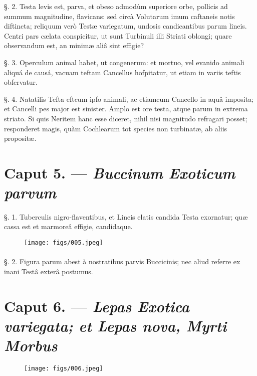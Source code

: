 \documentclass[a4paper, 11pt, oneside, polutonikogreek, german]{article}
\begin{document}
§. 2. Testa levis est, parva, et obeso admodùm superiore orbe, pollicis ad summum magnitudine, flavicans: sed circà Volutarum imum caftaneis notis diftincta; reliquum verò Testæ variegatum, undosis candicantibus parum lineis. Centri pars cælata conspicitur, ut sunt Turbinuli illi Striati oblongi; quare observandum est, an minimæ aliâ sint effigie?

§. 3. Operculum animal habet, ut congenerum: et mortuo, vel evanido animali aliquá de causá, vacuam teftam Cancellus hofpitatur, ut etiam in variis teftis obfervatur.

§. 4. Natatilis Tefta eftcum ipfo animali, ac etiamcum Cancello in aquâ imposita; et Cancelli pes major est sinister. Amplo est ore testa, atque parum in extrema striato. Si quis Neritem hanc esse diceret, nihil nisi magnitudo refragari posset; responderet magis, quàm Cochlearum tot species non turbinatæ, ab aliis propositæ.

\section{Caput 5. --- \emph{Buccinum Exoticum parvum}}
\paragraph{}
§. 1. Tuberculis nigro-flaventibus, et Lineis elatis candida Testa exornatur; quæ cassa est et marmoreâ effigie, candidaque.

\begin{figure}[H]
\centering
\texttt{[image: figs/005.jpeg]}

\end{figure}
\paragraph{}
§. 2. Figura parum abest à nostratibus parvis Buccicinis; nec aliud referre ex inani Testâ exterâ postumus.

\section{Caput 6. --- \emph{Lepas Exotica variegata; et Lepas nova, Myrti Morbus}}
\begin{figure}[H]
\centering
\texttt{[image: figs/006.jpeg]}

\end{figure}
\end{document}
